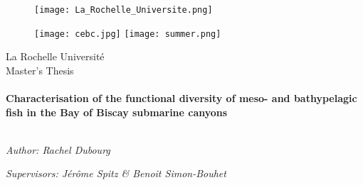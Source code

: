 \begin{titlepage}

\begin{figure}[ht]
	\begin{center}
			\texttt{[image: La\_Rochelle\_Universite.png]}
			\label{logoLR}
	   \endminipage
	\end{center}
	\begin{center}
			\texttt{[image: cebc.jpg]}
			\label{logocebc}
	\endminipage
			\texttt{[image: summer.png]}
			\label{summer}
	\endminipage
	\end{center}

\end{figure}


\begin{center}

{\LARGE La Rochelle Université}\\[1.5cm] %
{\Large Master's Thesis}\\[0.5cm] %

\HRule \\[0.4cm] %
{\huge \bfseries Characterisation of the functional diversity of meso- and bathypelagic fish in the Bay of Biscay submarine canyons }\\[0.4cm] %
\HRule \\[1.5cm] %

\begin{minipage}{0.4\textwidth}
\begin{flushleft} \large
\emph{Author: Rachel Dubourg}\\
\end{flushleft}
\end{minipage}
\begin{minipage}{0.4\textwidth}
\begin{flushright} \large
\emph{Supervisors: Jérôme Spitz \& Benoit Simon-Bouhet} \\
\end{flushright}
\end{minipage}\\[3cm]


\end{center}
\end{titlepage}
